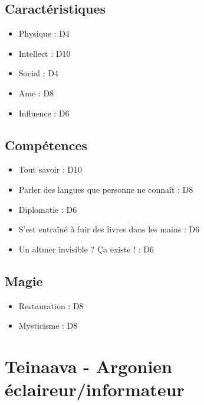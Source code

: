 \documentclass{Tamriel}
\begin{document}
\begin{multicols*}{2}
        \columnbreak
                
        \section*{Caractéristiques}

        \begin{itemize}
        \item Physique : D4
        \item Intellect : D10
        \item Social : D4
        \item Ame : D8
        \item Influence : D6
        \end{itemize}

        \section*{Compétences}

        \begin{itemize}
        \item Tout savoir : D10
        \item Parler des langues que personne ne connaît : D8
        \item Diplomatie : D6
        \item S'est entraîné à fuir des livres dans les mains : D6
        \item Un altmer invisible ? Ça existe ! : D6
        \end{itemize}
        
        \section*{Magie}

        \begin{itemize}
        \item Restauration : D8
        \item Mysticisme : D8
        \end{itemize}

\end{multicols*}

\chapter*{Teinaava - Argonien éclaireur/informateur}
\end{document}
